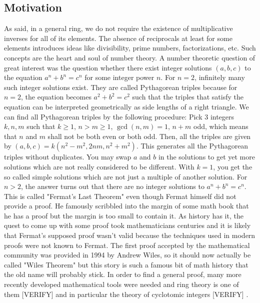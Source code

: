 \subsection{Motivation}
As said, in a general ring, we do not require the existence of multiplicative inverses for all of its elements. The absence of reciprocals at least for some elements introduces ideas like divisibility, prime numbers, factorizations, etc. Such concepts are the heart and soul of number theory. A number theoretic question of great interest was the question whether there exist integer solutions $(a,b,c)$ to the equation $a^n + b^n = c^n$ for some integer power $n$. For $n=2$, infinitely many such integer solutions exist. They are called Pythagorean triples because for $n=2$, the equation becomes $a^2 + b^2 = c^2$ such that the triples that satisfy the equation can be interpreted geometrically as side lengths of a right triangle. We can find all Pythagorean triples by the following procedure: Pick 3 integers $k,n,m$ such that $k \geq 1$, $n > m \geq 1$, $\gcd(n,m) = 1$, $n + m$ odd, which means that $n$ and $m$ shall not be both even or both odd. Then, all the triples are given by $(a,b,c) = k (n^2 - m^2, 2 n m, n^2 + m^2)$. This generates all the Pythagorean triples without duplicates. You may swap $a$ and $b$ in the solutions to get yet more solutions which are not really considered to be different. With $k=1$, you get the so called simple solutions which are not just a multiple of another solution. For $n > 2$, the answer turns out that there are no integer solutions to $a^n + b^n = c^n$. This is called "Fermat's Last Theorem" even though Fermat himself did not provide a proof. He famously scribbled into the margin of some math book that he has a proof but the margin is too small to contain it. As history has it, the quest to come up with some proof took mathematicians centuries and it is likely that Fermat's supposed proof wasn't valid because the techniques used in modern proofs were not known to Fermat. The first proof accepted by the mathematical community was provided in 1994 by Andrew Wiles, so it should now actually be called "Wiles Theorem" but this story is such a famous bit of math history that the old name will probably stick. In order to find a general proof, many more recently developed mathematical tools were needed and ring theory is one of them [VERIFY] and in particular the theory of cyclotomic integers [VERIFY] .


